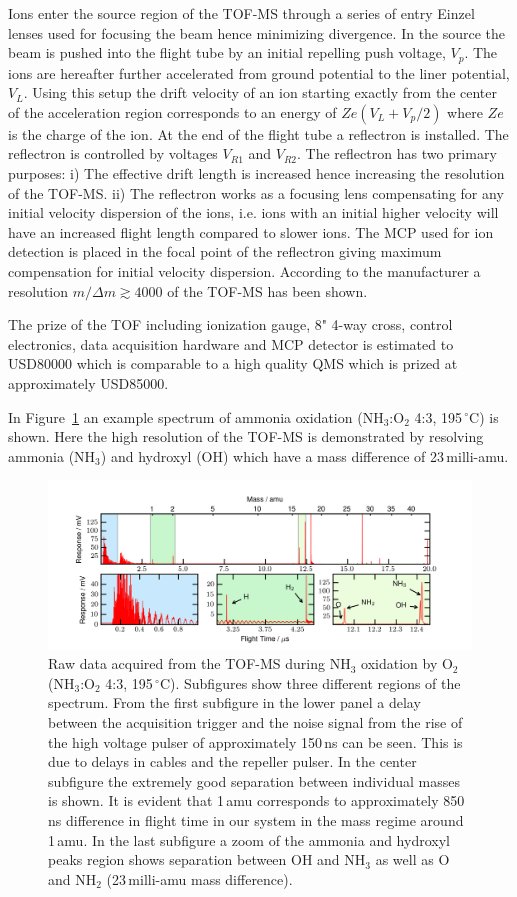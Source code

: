 \documentclass[aip,rsi]{revtex4-1}
\begin{document}
Ions enter the source region of the TOF-MS through a series of entry Einzel lenses used for focusing the beam hence minimizing divergence. In the source the beam is pushed into the flight tube by an initial repelling push voltage, $V_p$. The ions are hereafter further accelerated from ground potential to the liner potential, $V_L$. Using this setup the drift velocity of an ion starting exactly from the center of the acceleration region corresponds to an energy of $Ze\left(V_L + V_p/2\right)$ where $Ze$ is the charge of the ion. At the end of the flight tube a reflectron is installed. The reflectron is controlled by voltages $V_{R1}$ and $V_{R2}$. The reflectron has two primary purposes: i) The effective drift length is increased hence increasing the resolution of the TOF-MS. ii) The reflectron works as a focusing lens compensating for any initial velocity dispersion of the ions, i.e. ions with an initial higher velocity will have an increased flight length compared to slower ions. The MCP used for ion detection is placed in the focal point of the reflectron giving maximum compensation for initial velocity dispersion. According to the manufacturer a resolution $m/\Delta m\gtrsim4000$ of the TOF-MS has been shown.

The prize of the TOF including ionization gauge, 8" 4-way cross, control electronics, data acquisition hardware and MCP detector is estimated to USD80000 which is comparable to a high quality QMS which is prized at approximately USD85000.

In Figure~\ref{fig:untreated_data} an example spectrum of ammonia oxidation (NH$_3$:O$_2$ 4:3, 195\,$^{\circ}$C) is shown. Here the high resolution of the TOF-MS is demonstrated by resolving ammonia (NH$_3$) and hydroxyl (OH) which have a mass difference of 23\,milli-amu.
\begin{figure}
 \includegraphics[width=16cm]{untreated_data.png}%
 \caption{Raw data acquired from the TOF-MS during NH$_3$ oxidation by O$_2$ (NH$_3$:O$_2$ 4:3, 195\,$^{\circ}$C). Subfigures show three different regions of the spectrum. From the first subfigure in the lower panel a delay between the acquisition trigger and the noise signal from the rise of the high voltage pulser of approximately 150\,ns can be seen. This is due to delays in cables and the repeller pulser. In the center subfigure the extremely good separation between individual masses is shown. It is evident that 1\,amu corresponds to approximately 850\,ns difference in flight time in our system in the mass regime around 1\,amu. In the last subfigure a zoom of the ammonia and hydroxyl peaks region shows separation between OH and NH$_3$ as well as O and NH$_2$  (23\,milli-amu mass difference).\label{fig:untreated_data}}%
\end{figure}
\end{document}

